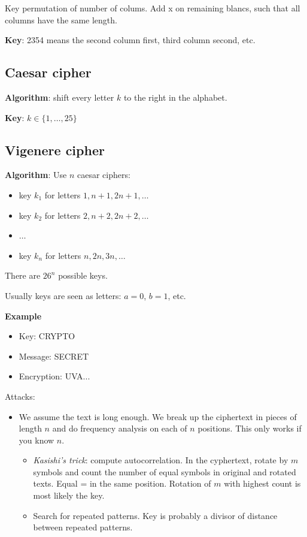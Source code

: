 \documentclass[language=english,number=]{homework}
\begin{document}
    Key permutation of number of colums.
    Add x on remaining blancs, such that all columns have the same length.

    \textbf{Key}: 2354 means the second column first, third column second, etc.

    \subsection{Caesar cipher}

    \textbf{Algorithm}: shift every letter $k$ to the right in the alphabet.

    \textbf{Key}: $k \in \{1, \dots, 25\}$

    \subsection{Vigenere cipher}

    \textbf{Algorithm}: Use $n$ caesar ciphers:
    \begin{itemize}
        \item key $k_1$ for letters $1, n+1, 2n+1, \dots$
        \item key $k_2$ for letters $2, n+2, 2n+2, \dots$
        \item $\dots$
        \item key $k_n$ for letters $n, 2n, 3n, \dots$
    \end{itemize}
    There are $26^n$ possible keys.

    Usually keys are seen as letters: $a=0$, $b=1$, etc.

    \textbf{Example}
    \begin{itemize}
        \item Key: CRYPTO
        \item Message: SECRET
        \item Encryption: UVA...
    \end{itemize}

    Attacks:
    \begin{itemize}
        \item We assume the text is long enough. We break up the ciphertext in pieces of length $n$ and do frequency analysis on each of $n$ positions.
        This only works if you know $n$.
        \begin{itemize}
            \item \textit{Kasishi's trick}: compute autocorrelation.
            In the cyphertext, rotate by $m$ symbols and count the number of equal symbols in original and rotated texts.
            Equal = in the same position.
            Rotation of $m$ with highest count is most likely the key.
            \item Search for repeated patterns.
            Key is probably a divisor of distance between repeated patterns.
        \end{itemize}
    \end{itemize}
\end{document}
